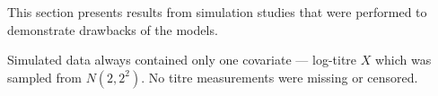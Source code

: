 This section presents results from simulation studies that were performed to demonstrate drawbacks of the models.

Simulated data always contained only one covariate --- log-titre $X$ which was sampled from $N(2, 2^2)$. No titre measurements were missing or censored.
